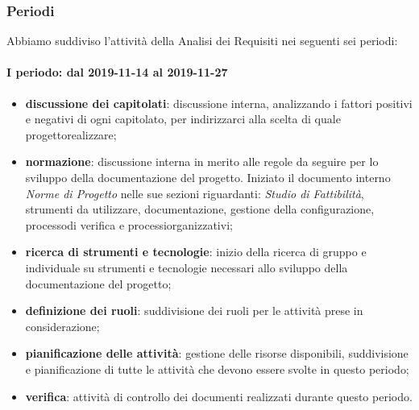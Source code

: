 \subsubsection{Periodi}
Abbiamo suddiviso l'attività della Analisi dei Requisiti nei seguenti sei periodi:
\paragraph*{I periodo: dal 2019-11-14 al 2019-11-27}
\begin{itemize}
	\item \textbf{discussione dei capitolati}\glo: discussione interna, analizzando i fattori positivi e negativi di ogni capitolato\glo, per indirizzarci alla scelta di quale progetto\glosp realizzare;
	\item \textbf{normazione}: discussione interna in merito alle regole da seguire per lo sviluppo della documentazione del progetto\glo. Iniziato il documento interno \textit{Norme di Progetto} nelle sue sezioni riguardanti: \textit{Studio di Fattibilità}, strumenti da utilizzare, documentazione, gestione della configurazione, processo\glosp di verifica e processi\glosp organizzativi;
	\item \textbf{ricerca di strumenti e tecnologie}: inizio della ricerca di gruppo e individuale su strumenti e tecnologie necessari allo sviluppo della documentazione del progetto\glo;
	\item \textbf{definizione dei ruoli}: suddivisione dei ruoli per le attività prese in considerazione; 
	\item \textbf{pianificazione delle attività}: gestione delle risorse disponibili, suddivisione e pianificazione di tutte le attività che devono essere svolte in questo periodo;
	\item \textbf{verifica}: attività di controllo dei documenti realizzati durante questo periodo.
\end{itemize}

